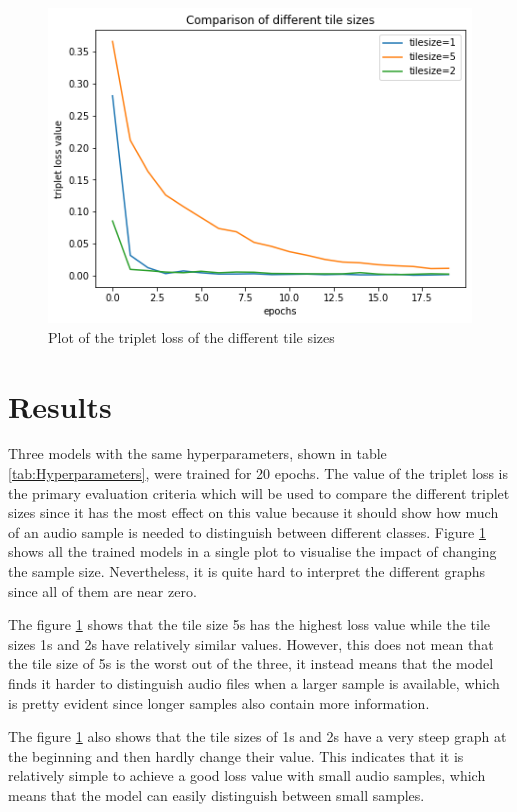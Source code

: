 \documentclass[twocolumn]{article}
\begin{document}
\begin{figure}[t]
\centering
    \includegraphics[width=\linewidth]{assets/tile_sizes_plot.png}
    \caption{Plot of the triplet loss of the different tile sizes}
    \label{fig:tile-size-plot}
\end{figure}

\section{Results}
Three models with the same hyperparameters, shown in table \ref{tab:Hyperparameters}, were trained for 20 epochs. The value of the triplet loss is the primary evaluation criteria which will be used to compare the different triplet sizes since it has the most effect on this value because it should show how much of an audio sample is needed to distinguish between different classes. Figure \ref{fig:tile-size-plot} shows all the trained models in a single plot to visualise the impact of changing the sample size. Nevertheless, it is quite hard to interpret the different graphs since all of them are near zero.

The figure \ref{fig:tile-size-plot} shows that the tile size 5s has the highest loss value while the tile sizes 1s and 2s have relatively similar values. However, this does not mean that the tile size of 5s is the worst out of the three, it instead means that the model finds it harder to distinguish audio files when a larger sample is available, which is pretty evident since longer samples also contain more information.

The figure \ref{fig:tile-size-plot} also shows that the tile sizes of 1s and 2s have a very steep graph at the beginning and then hardly change their value. This indicates that it is relatively simple to achieve a good loss value with small audio samples, which means that the model can easily distinguish between small samples.
\end{document}
